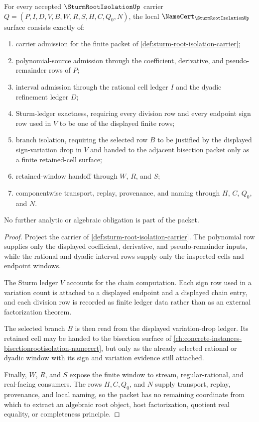 \begin{theorem}
\label{thm:sturm-root-isolation-namecert-obligations}
For every accepted $\SturmRootIsolationUp$ carrier $Q=(P,I,D,V,B,W,R,S,H,C,Q_0,N)$, the local $\NameCert_{\SturmRootIsolationUp}$ surface consists exactly of:
\begin{enumerate}
\item carrier admission for the finite packet of \autoref{def:sturm-root-isolation-carrier};
\item polynomial-source admission through the coefficient, derivative, and pseudo-remainder rows of $P$;
\item interval admission through the rational cell ledger $I$ and the dyadic refinement ledger $D$;
\item Sturm-ledger exactness, requiring every division row and every endpoint sign row used in $V$ to be one of the displayed finite rows;
\item branch isolation, requiring the selected row $B$ to be justified by the displayed sign-variation drop in $V$ and handed to the adjacent bisection packet only as a finite retained-cell surface;
\item retained-window handoff through $W$, $R$, and $S$;
\item componentwise transport, replay, provenance, and naming through $H$, $C$, $Q_0$, and $N$.
\end{enumerate}
No further analytic or algebraic obligation is part of the packet.
\end{theorem}
\begin{proof}
Project the carrier of \autoref{def:sturm-root-isolation-carrier}. The polynomial row supplies only the displayed coefficient, derivative, and pseudo-remainder inputs, while the rational and dyadic interval rows supply only the inspected cells and endpoint windows.

The Sturm ledger $V$ accounts for the chain computation. Each sign row used in a variation count is attached to a displayed endpoint and a displayed chain entry, and each division row is recorded as finite ledger data rather than as an external factorization theorem.

The selected branch $B$ is then read from the displayed variation-drop ledger. Its retained cell may be handed to the bisection surface of \autoref{ch:concrete-instances-bisectionrootisolation-namecert}, but only as the already selected rational or dyadic window with its sign and variation evidence still attached.

Finally, $W$, $R$, and $S$ expose the finite window to stream, regular-rational, and real-facing consumers. The rows $H,C,Q_0$, and $N$ supply transport, replay, provenance, and local naming, so the packet has no remaining coordinate from which to extract an algebraic root object, host factorization, quotient real equality, or completeness principle.
\end{proof}

